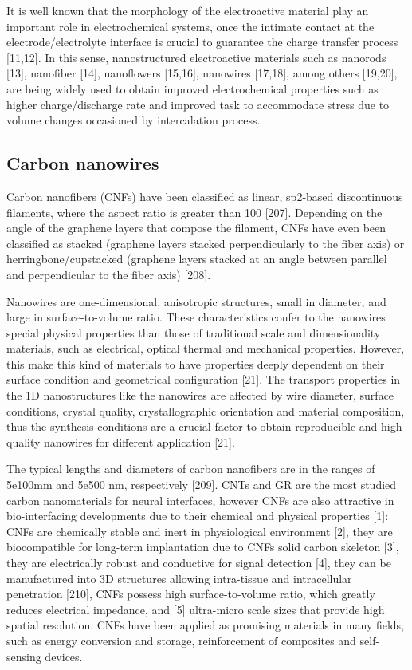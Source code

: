 It is well known that the morphology of the electroactive material play an important role in electrochemical systems, once the intimate contact at the electrode/electrolyte interface is crucial to guarantee the charge transfer process [11,12]. In this sense, nanostructured electroactive materials such as nanorods [13], nanofiber [14], nanoflowers [15,16], nanowires [17,18], among others [19,20], are being widely used to obtain improved electrochemical properties such as higher charge/discharge rate and improved task to accommodate stress due to volume changes occasioned by intercalation process.

\subsection{Carbon nanowires}

Carbon nanofibers (CNFs) have been classified as linear, sp2-based discontinuous filaments, where the aspect ratio is greater than 100 [207]. Depending on the angle of the graphene layers that compose the filament, CNFs have even been classified as stacked (graphene layers stacked perpendicularly to the fiber axis) or herringbone/cupstacked (graphene layers stacked at an angle between parallel and perpendicular to the fiber axis) [208].

Nanowires are one-dimensional, anisotropic structures, small in diameter, and large in surface-to-volume ratio. These characteristics confer to the nanowires special physical properties than those of traditional scale and dimensionality materials, such as electrical, optical thermal and mechanical properties. However, this make this kind of materials to have properties deeply dependent on their surface condition and geometrical configuration [21]. The transport properties in the 1D nanostructures like the nanowires are affected by wire diameter, surface conditions, crystal quality, crystallographic orientation and material composition, thus the synthesis conditions are a crucial factor to obtain reproducible and high-quality nanowires for different application [21].

The typical lengths and diameters of carbon nanofibers are in the ranges of 5e100mm and 5e500 nm, respectively [209]. CNTs and GR are the most studied carbon nanomaterials for neural interfaces, however CNFs are also attractive in bio-interfacing developments due to their chemical and physical properties [1]: CNFs are chemically stable and inert in physiological environment [2], they are biocompatible for long-term implantation due to CNFs solid carbon skeleton [3], they are electrically robust and conductive for signal detection [4], they can be manufactured into 3D structures allowing intra-tissue and intracellular penetration [210], CNFs possess high surface-to-volume ratio, which greatly reduces electrical impedance, and [5] ultra-micro scale sizes that provide high spatial resolution. CNFs have been applied as promising materials in many fields, such as energy conversion and storage, reinforcement of composites and self-sensing devices.

